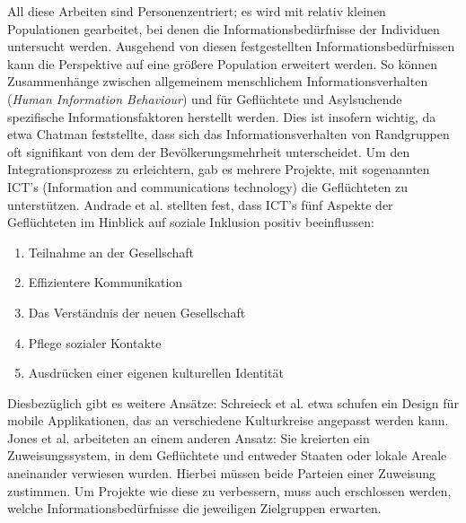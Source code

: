All diese Arbeiten sind Personenzentriert; es wird mit relativ kleinen Populationen gearbeitet, bei denen die Informationsbedürfnisse der Individuen untersucht werden. Ausgehend von diesen festgestellten Informationsbedürfnissen kann die Perspektive auf eine größere Population erweitert werden. So können Zusammenhänge zwischen allgemeinem menschlichem Informationsverhalten (\textit{Human Information Behaviour}) und für Geflüchtete und Asylsuchende spezifische Informationsfaktoren herstellt werden.\cite{oduntan2017investigating}\newline
Dies ist insofern wichtig, da etwa Chatman feststellte, dass sich das Informationsverhalten von Randgruppen oft signifikant von dem der Bev\"olkerungsmehrheit unterscheidet. \cite{chatman1996impoverished}
\newline
\newline 
Um den Integrationsprozess zu erleichtern, gab es mehrere Projekte, mit sogenannten ICT's (Information and communications technology) die Geflüchteten zu unterstützen. Andrade et al. stellten fest, dass ICT's  f\"unf Aspekte der Gefl\"uchteten im Hinblick auf soziale Inklusion positiv beeinflussen:
\begin{enumerate}
    \item   Teilnahme an der Gesellschaft
    \item   Effizientere Kommunikation
    \item   Das Verst\"andnis der neuen Gesellschaft
    \item   Pflege sozialer Kontakte
    \item   Ausdr\"ucken einer eigenen kulturellen Identit\"at
\end{enumerate}
Diesbez\"uglich gibt es weitere Ans\"atze:\newline
Schreieck et al. etwa schufen ein Design f\"ur mobile Applikationen, das an verschiedene Kulturkreise angepasst werden kann. \cite{schreieck2017supporting}\newline
Jones et al. arbeiteten an einem anderen Ansatz: Sie kreierten ein Zuweisungssystem, in dem Gefl\"uchtete und entweder Staaten oder lokale Areale aneinander verwiesen wurden. Hierbei m\"ussen beide Parteien einer Zuweisung zustimmen. \cite{jones2017matching}\newline
Um Projekte wie diese zu verbessern, muss auch erschlossen werden, welche Informationsbed\"urfnisse die jeweiligen Zielgruppen erwarten.\newline

